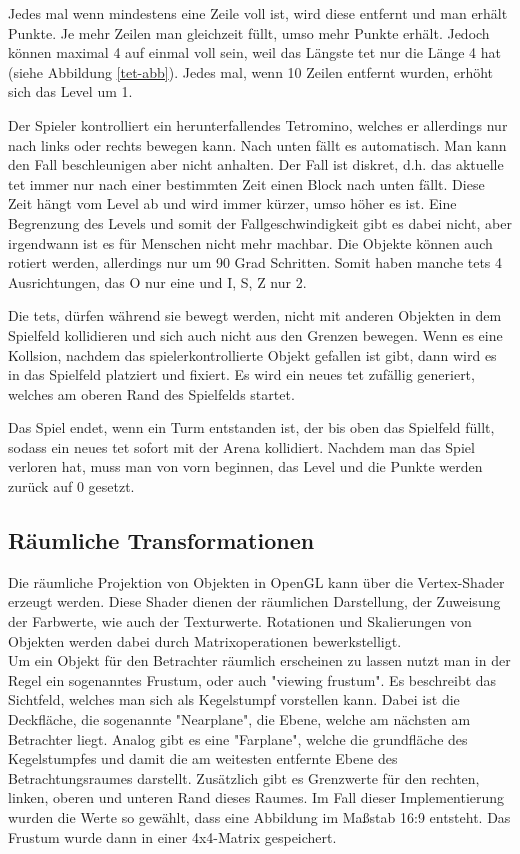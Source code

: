 \documentclass[11pt]{article}
\newcommand{\refabb}[1]{Abbildung \ref{#1}}
\begin{document}
Jedes mal wenn mindestens eine Zeile voll ist, wird diese entfernt und man erhält Punkte.
Je mehr Zeilen man gleichzeit füllt, umso mehr Punkte erhält. Jedoch können maximal 4 auf einmal voll sein, weil das Längste \gls{tet} 
nur die Länge 4 hat (siehe \refabb{tet-abb}). Jedes mal, wenn 10 Zeilen entfernt wurden, erhöht sich das Level um 1. \cite{TetrisWiki}

Der Spieler kontrolliert ein herunterfallendes Tetromino, welches er allerdings nur nach links oder rechts bewegen kann.
Nach unten fällt es automatisch. Man kann den Fall beschleunigen aber nicht anhalten. 
Der Fall ist diskret, d.h. das aktuelle \gls{tet} immer nur nach einer bestimmten Zeit einen Block nach unten fällt.
Diese Zeit hängt vom Level ab und wird immer kürzer, umso höher es ist. Eine Begrenzung des Levels und somit der Fallgeschwindigkeit gibt es dabei nicht,
aber irgendwann ist es für Menschen nicht mehr machbar.
Die Objekte können auch rotiert werden, allerdings nur um 90 Grad Schritten. Somit haben manche \glspl{tet} 4 Ausrichtungen, das O nur eine und I, S, Z nur 2.

Die \glspl{tet}, dürfen während sie bewegt werden, nicht mit anderen Objekten in dem Spielfeld kollidieren und sich auch nicht aus den Grenzen bewegen.
Wenn es eine Kollsion, nachdem das spielerkontrollierte Objekt gefallen ist gibt, dann wird es in das Spielfeld platziert und fixiert. Es wird ein neues \gls{tet} 
zufällig generiert, welches am oberen Rand des Spielfelds startet.

Das Spiel endet, wenn ein Turm entstanden ist, der bis oben das Spielfeld füllt, sodass ein neues \gls{tet} sofort mit der Arena kollidiert.
Nachdem man das Spiel verloren hat, muss man von vorn beginnen, das Level und die Punkte werden zurück auf 0 gesetzt.

\subsection{Räumliche Transformationen}

Die räumliche Projektion von Objekten in OpenGL kann über die Vertex-Shader erzeugt werden. Diese Shader dienen der räumlichen Darstellung, der Zuweisung der Farbwerte,
wie auch der Texturwerte. Rotationen und Skalierungen von Objekten werden dabei durch Matrixoperationen bewerkstelligt. \\
Um ein Objekt für den Betrachter räumlich erscheinen zu lassen nutzt man in der Regel ein sogenanntes Frustum, oder auch "viewing frustum". Es beschreibt das Sichtfeld, 
welches man sich als Kegelstumpf vorstellen kann. Dabei ist die Deckfläche, die sogenannte "Nearplane", die Ebene, welche am nächsten am Betrachter liegt. Analog gibt es 
eine "Farplane", welche die grundfläche des Kegelstumpfes und damit die am weitesten entfernte Ebene des Betrachtungsraumes darstellt.
Zusätzlich gibt es Grenzwerte für den rechten, linken, oberen und unteren Rand dieses Raumes.
Im Fall dieser Implementierung wurden die Werte so gewählt, dass eine Abbildung im Maßstab 16:9 entsteht. Das Frustum wurde dann in einer 4x4-Matrix gespeichert.
\end{document}
